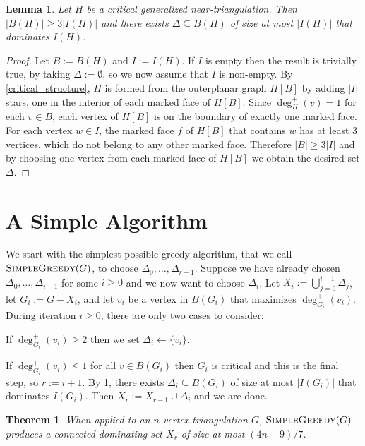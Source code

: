 \documentclass{article}
\newtheorem{thm}{Theorem}
\newtheorem{lem}{Lemma}
\theoremstyle{definition}
\begin{document}
\begin{lem}\label{base_case}
    Let $H$ be a critical generalized near-triangulation. Then $|B(H)|\ge 3|I(H)|$ and there exists $\Delta\subseteq B(H)$ of size at most $|I(H)|$ that dominates $I(H)$.
\end{lem}

\begin{proof}
  Let $B:=B(H)$ and $I:=I(H)$.  If $I$ is empty then the result is trivially true, by taking $\Delta:=\emptyset$, so we now assume that $I$ is non-empty.  By \cref{critical_structure}, $H$ is formed from the outerplanar graph $H[B]$ by adding $|I|$ stars, one in the interior of each marked face of $H[B]$.  Since $\deg_H^+(v)=1$ for each $v\in B$, each vertex of $H[B]$ is on the boundary of exactly one marked face.  For each vertex $w\in I$, the marked face $f$ of $H[B]$ that contains $w$ has at least $3$ vertices, which do not belong to any other marked face. Therefore $|B|\ge 3|I|$ and by choosing one vertex from each marked face of $H[B]$ we obtain the desired set $\Delta$.
\end{proof}


\section{A Simple Algorithm}
\label{warm_up}

We start with the simplest possible greedy algorithm, that we call $\textsc{SimpleGreedy}(G)$, to choose $\Delta_0,\ldots,\Delta_{r-1}$.  Suppose we have already chosen $\Delta_0,\ldots,\Delta_{i-1}$ for some $i\ge 0$ and we now want to choose $\Delta_i$.  Let $X_i:=\bigcup_{j=0}^{i-1}\Delta_j$, let $G_i:=G-X_i$, and let $v_i$ be a vertex in $B(G_i)$ that maximizes $\deg^+_{G_i}(v_i)$.  During iteration $i\ge 0$, there are only two cases to consider:
\begin{compactenum}[{[}g1{]}]
    \item If $\deg^+_{G_i}(v_i)\ge 2$ then we set $\Delta_i\gets\{v_i\}$.
    \item If $\deg^+_{G_i}(v_i)\le 1$ for all $v\in B(G_i)$ then $G_i$ is critical and this is the final step, so $r:=i+1$.  By \cref{base_case}, there exists $\Delta_i\subseteq B(G_i)$ of size at most $|I(G_i)|$ that dominates $I(G_i)$. Then $X_r:=X_{r-1}\cup\Delta_{i}$ and we are done.
\end{compactenum}

\begin{thm}\label{simple_greedy}
  When applied to an $n$-vertex triangulation $G$,  $\textsc{SimpleGreedy}(G)$ produces a connected dominating set $X_r$ of size at most $(4n-9)/7$.
\end{thm}
\end{document}

